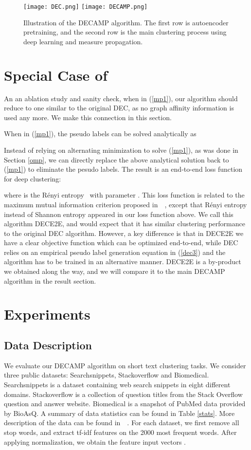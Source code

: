 \documentclass[letterpaper]{article}
\begin{document}
\begin{figure}
  \centering
      \texttt{[image: DEC.png]}
      \texttt{[image: DECAMP.png]}
  \caption{Illustration of the DECAMP algorithm. The first row is autoencoder pretraining, and the second row is the main clustering process using deep learning and measure propagation.}
\end{figure} 

\section{Special Case of }
An an ablation study and sanity check, when  in (\ref{mp1}), our algorithm should reduce to one similar to the original DEC, as no graph affinity information is used any more. We make this connection in this section.

When  in (\ref{mp1}), the pseudo labels can be solved analytically as 

Instead of relying on alternating minimization to solve (\ref{mp1}), as was done in Section \ref{omp}, we can directly replace the above analytical solution back to (\ref{mp1}) to eliminate the pesudo labels. The result is an end-to-end loss function for deep clustering:

where  is the R\'enyi entropy~\cite{principe} with parameter . This loss function is related to the maximum mutual information criterion proposed in~\cite{perona}~\cite{imsat}, except that R\'enyi entropy instead of Shannon entropy appeared in our loss function above. We call this algorithm DECE2E, and would expect that it has similar clustering performance to the original DEC algorithm. However, a key difference is that in DECE2E we have a clear objective function which can be optimized end-to-end,  while DEC relies on an empirical pseudo label generation equation in (\ref{dec3}) and the algorithm has to be trained in an alternative manner. DECE2E is a by-product we obtained along the way, and we will compare it to the main DECAMP algorithm in the result section.

\section{Experiments}
\subsection{Data Description}
We evaluate our DECAMP algorithm on short text clustering tasks. We consider three public datasets: Searchsnippets, Stackoverflow and Biomedical. Searchsnippets is a dataset containing web search snippets in eight different domains. Stackoverflow is a collection of question titles from the Stack Overflow question and answer website. Biomedical is a snapshot of PubMed data provided by BioAsQ. A summary of data statistics can be found in Table \ref{stats}. More description of the data can be found in~\cite{stc2}~\cite{acl}. For each dataset, we first remove all stop words, and extract tf-idf features on the 2000 most frequent words. After applying  normalization, we obtain the feature input vectors . 
\end{document}

